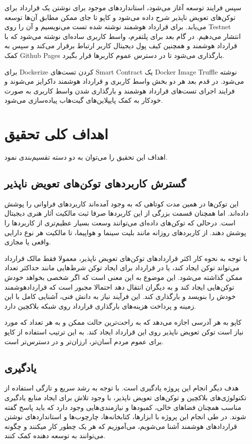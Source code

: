 سپس فرایند توسعه آغاز می‌شود، استاندارد‌های موجود برای نوشتن یک قرارداد برای توکن‌های تعویض ناپذیر شرح داده می‌شود و کاپو تا جای ممکن مطابق آن‌ها توسعه می‌یابد. برای قرارداد هوشمند نوشته شده تست می‌نویسیم و آن را روی
\gls{Testnet}
انتشار می‌دهیم.
در گام بعد برای پلتفرم، واسط کاربری ساده‌ای نوشته می‌شود که با قرارداد هوشمند و همچنین کیف پول دیجیتال کاربر ارتباط برقرار می‌کند و سپس به کمک
\gls{Github Pages}
بارگذاری می‌شود تا در دسترس عموم کاربرها قرار بگیرد.

برای
\gls{Dockerize}
کردن تست‌های
\gls{Smart Contract}
یک
\gls{Docker Image}
\gls{Truffle}
نوشته می‌شود. در قدم بعد هر دو بخش واسط کاربری و قرارداد هوشمند داکرایز می‌شوند و فرایند اجرای تست‌های قرارداد هوشمند و بارگذاری شدن واسط کاربری به صورت خودکار به کمک پایپلاین‌های گیت‌هاب پیاده‌سازی می‌شود.


\section{اهداف کلی تحقیق}
اهداف این تحقیق را می‌توان به دو دسته تقسیم‌بندی نمود.

\subsection{گسترش کاربرد‌های توکن‌های تعویض ناپذیر}
این توکن‌ها در همین مدت کوتاهی که به وجود آمده‌اند کاربردهای فراوانی را پوشش داده‌اند. اما همچنان قسمت بزرگی از این کاربردها صرفا ثبت مالکیت آثار هنری دیجیتال است. درحالی که توکن‌های داده‌ای می‌توانند وسعت بسیار عظیم‌تری از کاربردها را پوشش دهند. از کاربردهای روزانه مانند بلیت سینما و هواپیما، تا مالکیت هر نوع دارایی واقعی یا مجازی.

با توجه به نحوه کار اکثر قراردادهای توکن‌های تعویض ناپذیر، معمولا فقط مالک قرارداد می‌تواند توکن ایجاد کند، یا در قرارداد برای ایجاد توکن شرط‌هایی مانند حداکثر تعداد ممکن گذاشته می‌شود. این موضوع به این معنی است که اگر شخصی بخواهد خودش توکن‌هایی ایجاد کند و به دیگران انتقال دهد احتمالا مجبور است که قراردادهوشمند خودش را بنویسد و بارگذاری کند. این فرآیند نیاز به دانش فنی، آشنایی کامل با این زمینه و پرداخت هزینه‌های بارگذاری قرارداد روی شبکه بلاکچین دارد.

کاپو به هر آدرسی اجازه می‌دهد که به راحت‌ترین حالت ممکن و به هر تعداد که مورد نیاز است توکن تعویض ناپذیر روی این قرارداد ایجاد کند. به این ترتیب استفاده از کاپو برای عموم مردم آسان‌تر، ارزان‌تر و در دسترس‌تر است.

\subsection{یادگیری}
هدف دیگر انجام این پروژه یادگیری است. با توجه به رشد سریع و تازگی استفاده از تکنولوژی‌های بلاکچین و توکن‌های تعویض ناپذیر، با وجود تلاش برای ایجاد منابع یادگیری مناسب همچنان فضاهای خالی، کمبودها و نیازمندی‌هایی وجود دارد که باید پاسخ گفته شوند. در طی انجام این پروژه با ابزارها، کتابخانه‌ها، چارچوب‌ها و استانداردهای نوشتن قراردادهای هوشمند آشنا می‌شویم، می‌آموزیم که هر یک چطور کار میکنند و چگونه می‌توانند به توسعه دهنده کمک کنند.

